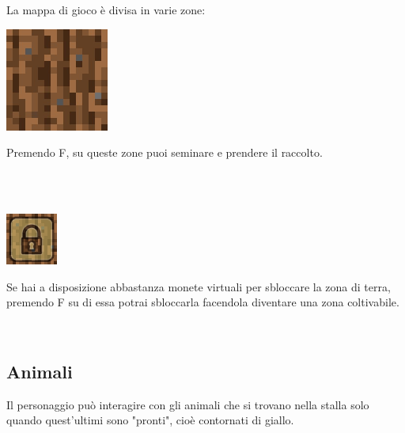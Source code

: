\documentclass[a4paper,12pt]{report}
\begin{document}
		{La mappa di gioco è divisa in varie zone:}\\
		
		
	
		\begin{minipage}{.30\textwidth}
			\centering
			\includegraphics[width=.50\textwidth]{img/farmland.png}
		\end{minipage}%
		\begin{minipage}{.70\textwidth}
			{Premendo F, su queste zone puoi seminare e prendere il raccolto.}
		\end{minipage}\\
	\\
	
	
		\begin{minipage}{.30\textwidth}
			\centering
			\includegraphics[width=.50\textwidth]{img/lock3.png}
		\end{minipage}%
		\begin{minipage}{.70\textwidth}
			{Se hai a disposizione abbastanza monete virtuali per sbloccare la zona di terra, premendo F su di essa potrai sbloccarla facendola diventare una zona coltivabile.}
		\end{minipage}\\


\subsection{Animali}
	\label{animali}
	Il personaggio può interagire con gli animali che si trovano nella stalla solo quando quest'ultimi sono "pronti", cioè contornati di giallo. 
	
\end{document}
